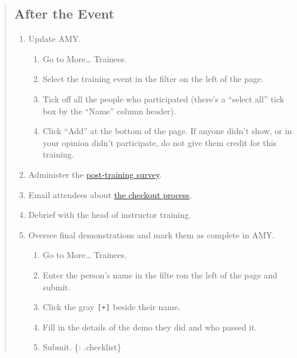 \begin{quote}
\subsection{After the Event}\label{after-the-event}

\begin{enumerate}
\def\labelenumi{\arabic{enumi}.}
\itemsep1pt\parskip0pt
\item
  Update AMY.

  \begin{enumerate}
  \def\labelenumii{\arabic{enumii}.}
  \itemsep1pt\parskip0pt
  \item
    Go to More\ldots{} Trainees.
  \item
    Select the training event in the filter on the left of the page.
  \item
    Tick off all the people who participated (there's a ``select all''
    tick box by the ``Name'' column header).
  \item
    Click ``Add'' at the bottom of the page. If anyone didn't show, or
    in your opinion didn't participate, do not give them credit for this
    training.
  \end{enumerate}
\item
  Administer the \href{\{\{site.training_post_survey\}\}}{post-training
  survey}.
\item
  Email attendees about
  \href{\{\{\%20page.root\%20\}\}/files/messages/checkout.txt}{the
  checkout process}.
\item
  Debrief with the head of instructor training.
\item
  Oversee final demonstrations and mark them as complete in AMY.

  \begin{enumerate}
  \def\labelenumii{\arabic{enumii}.}
  \itemsep1pt\parskip0pt
  \item
    Go to More\ldots{} Trainees.
  \item
    Enter the person's name in the filte ron the left of the page and
    submit.
  \item
    Click the gray \texttt{{[}+{]}} beside their name.
  \item
    Fill in the details of the demo they did and who passed it.
  \item
    Submit. \{: .checklist\}
  \end{enumerate}
\end{enumerate}
\end{quote}

